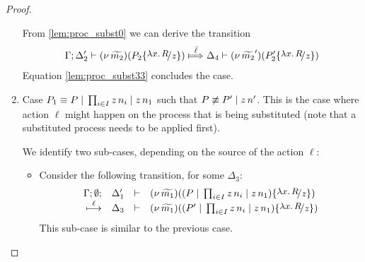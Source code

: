 \begin{proof}
\begin{enumerate}
				From \eqref{lem:proc_subst0} we can derive the transition
				\begin{eqnarray*}
					\horel{\Gamma}{\Delta_2'}{\newsp{\widetilde{m_2}}{P_2 \subst{{\abs{x}{R}}}{z} }}
					{\Hby{\mact{\ell}}}
					{\Delta_4}{\newsp{\widetilde{m_2}'}{P_2' \subst{{\abs{x}{R}}}{z} }}
				\end{eqnarray*}
				Equation \eqref{lem:proc_subst33} concludes the case.


		\item	Case $P_1 \equiv P \;|\; \prod_{i \in I} z\, {n_i} \;|\; z\, {n_1}$ such that
				$P \not\equiv P' \;|\; z\, {n'}$. This is the case where action $\ell$ might
				happen on the process that is being substituted (note that a substituted process
				needs to be applied first).

				We identify two sub-cases, depending on the source of the action $\ell$:
				\begin{itemize}
					\item	Consider the following transition, for some $\Delta_3$:
							\begin{eqnarray*}
								\mhorel{\Gamma}{\Delta_1'}{\newsp{\widetilde{m_1}}{(P \Par \prod_{i \in I} \appl{z}{n_i} \Par \appl{z}{n_1}) \subst{{\abs{x}{R}}}{z} }}
								{\hby{\ell}}
								{\Delta_3}{}{\newsp{\widetilde{m_1}}{(P' \Par \prod_{i \in I} \appl{z}{n_i} \Par \appl{z}{n_1}) \subst{{\abs{x}{R}}}{z} }}
							\end{eqnarray*}
							This sub-case is similar to the previous case.


\end{itemize}
\end{enumerate}
\end{proof}
